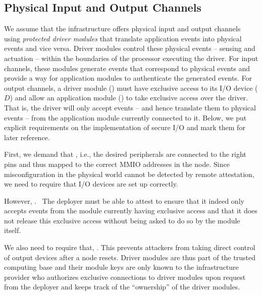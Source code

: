 \subsection{Physical Input and Output Channels}
%
\label{concept:protected-drivers}
%
We assume that the infrastructure offers physical input and output channels
using \emph{protected driver modules} that translate application events into
physical events and vice versa. Driver modules control these physical events --
sensing and actuation -- within the boundaries of the processor executing the
driver. For input channels, these modules generate events that correspond to
physical events and provide a way for application modules to authenticate the
generated events. 
%
\label{concept:output-attestation}
%
For output channels, a driver module () must have exclusive access to
its I/O device ($D$) and allow an application module () to take
exclusive access over the driver.  That is, the driver will only accept events
-- and hence translate them to physical events -- from the application module
currently connected to it. Below, we put explicit requirements on the implementation of secure I/O and mark them for later reference.

First, we demand that , i.e., the
desired peripherals are connected to the right pins and thus mapped to the
correct \ac{MMIO} addresses in the node. Since misconfiguration in the physical
world cannot be detected by remote attestation, we need to require that I/O
devices are set up correctly.

However, .~ The deployer must be able to attest 
to ensure that it indeed only accepts events from the module currently having
exclusive access and that it does not release this exclusive access without
being asked to do so by the module itself.

We also need to require that, . This prevents attackers from taking direct control of
output devices after a node resets. Driver modules are thus part of the trusted
computing base and their module keys are only known to the infrastructure
provider who authorizes exclusive connections to driver modules upon request
from the deployer and keeps track of the ``ownership'' of the driver modules.

